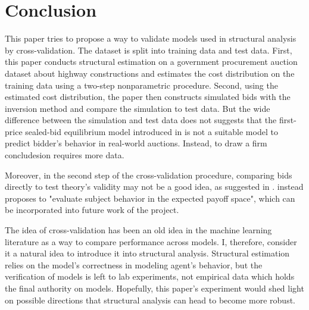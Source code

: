 \documentclass[11pt]{article}
\begin{document}
\section{Conclusion}
This paper tries to propose a way to validate models used in structural analysis 
by cross-validation. The dataset is split into training data and test 
data.
First, this paper conducts structural estimation on a government 
procurement auction dataset about highway constructions and estimates the 
cost distribution on the training data using a two-step nonparametric procedure.
Second, using the 
estimated cost distribution, the paper then constructs simulated bids with the 
inversion method and compare the simulation to test data. 
But the wide difference between the simulation and test data does not suggests
that the first-price sealed-bid equilibrium model introduced in 
\citeauthor{RileySamuelson1981} \citeyear{RileySamuelson1981}
is not a suitable model to predict bidder's 
behavior in real-world auctions. Instead, to draw a firm concludesion requires 
more data. 

Moreover, in the second step of the cross-validation procedure, comparing bids 
directly to test theory's validity may not be a good idea, as suggested in 
\citeauthor{Harrison1989} \citeyear{Harrison1989}. \citeauthor{Harrison1989}
\citeyear{Harrison1989} instead proposes to "evaluate subject behavior in the 
expected payoff space", which can be incorporated into future work of the project.

The idea of cross-validation has been an old idea in the machine learning 
literature as a way to compare performance across models. I, therefore, consider 
it a natural idea to introduce it into structural analysis. Structural estimation 
relies on the model's correctness in modeling agent's behavior, but the verification 
of models is left to lab experiments, not empirical data which holds the final 
authority on models. Hopefully, this paper's experiment would shed light on 
possible directions that structural analysis can head to become more robust. 


\medskip



\end{document}
